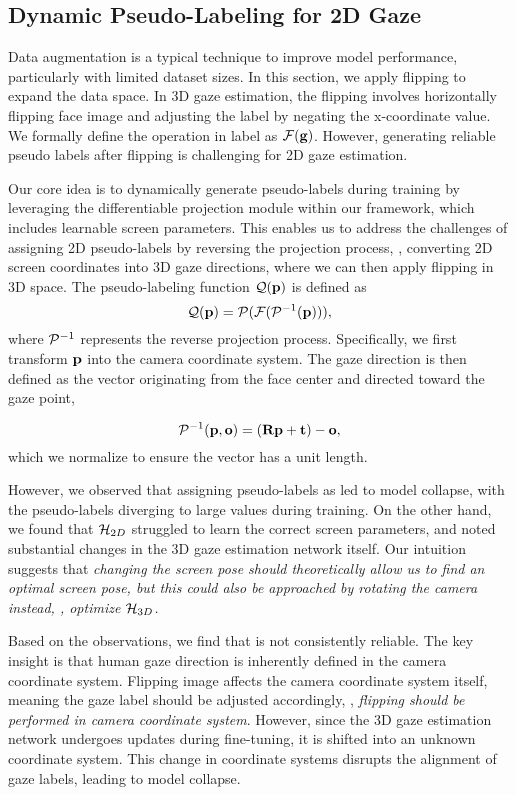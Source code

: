 \subsection{Dynamic Pseudo-Labeling for 2D Gaze}
Data augmentation is a typical technique to improve model performance, particularly with limited dataset sizes. In this section, we apply flipping to expand the data space.
In 3D gaze estimation, the flipping involves horizontally flipping face image and adjusting the label by negating the x-coordinate value. We formally define the operation in label as $\mathcal{F}(\mathbf{g})$.
However, generating reliable pseudo labels after flipping is challenging for 2D gaze estimation. 

Our core idea is to dynamically generate pseudo-labels during training by leveraging the differentiable projection module within our framework, which includes learnable screen parameters. 
This enables us to address the challenges of assigning 2D pseudo-labels by reversing the projection process, \ie, converting 2D screen coordinates into 3D gaze directions, where we can then apply flipping in 3D space. The pseudo-labeling function $\mathcal{Q}(\mathbf{p})$ is defined as 
\begin{equation}
    \mathcal{Q}(\mathbf{p}) = \mathcal{P}(\mathcal{F}(\mathcal{P}^{-1}(\mathbf{p}))),
    \label{equ:flip}
\end{equation}
\noindent where $\mathcal{P}^{-1}$ represents the reverse projection process.
Specifically, we first transform $\mathbf{p}$ into the camera coordinate system. The gaze direction is then defined as the vector originating from the face center and directed toward the gaze point,

\begin{equation}
    \mathcal{P}^{-1}(\mathbf{p}, \mathbf{o}) = (\mathbf{R}\mathbf{p} + \mathbf{t}) - \mathbf{o},
\end{equation}
\noindent which we normalize to ensure the vector has a unit length.

However, we observed that assigning pseudo-labels as  led to model collapse, with the pseudo-labels diverging to large values during training.
On the other hand, we found that $\mathcal{H}_{2D}$ struggled to learn the correct screen parameters, and noted substantial changes in the 3D gaze estimation network itself.
Our intuition suggests that \textit{changing the screen pose should theoretically allow us to find an optimal screen pose, but this could also be approached by rotating the camera instead, \ie, optimize $\mathcal{H}_{3D}$.}

Based on the observations, we find that  is not consistently reliable.
The key insight is that human gaze direction is inherently defined in the camera coordinate system. Flipping image affects the camera coordinate system itself, meaning the gaze label should be adjusted accordingly, \ie, \textit{flipping should be performed in camera coordinate system}. However, since the 3D gaze estimation network undergoes updates during fine-tuning, it is shifted into an unknown coordinate system.
This change in coordinate systems disrupts the alignment of gaze labels, leading to model collapse. 


